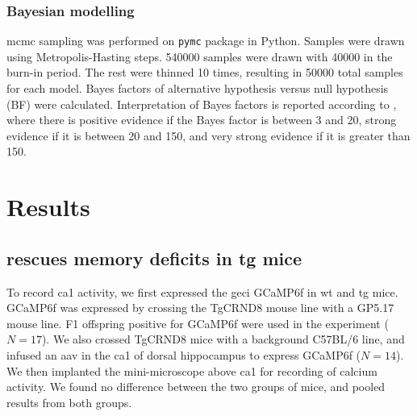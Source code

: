 \subsubsection{Bayesian modelling}
\Gls{mcmc} sampling was performed on \texttt{pymc} package in Python. Samples were drawn using Metropolis-Hasting steps. \num{540000} samples were drawn with \num{40000} in the burn-in period. The rest were thinned \num{10} times, resulting in \num{50000} total samples for each model. Bayes factors of alternative hypothesis versus null hypothesis (BF) were calculated. Interpretation of Bayes factors is reported according to \citet{kass95}, where there is positive evidence if the Bayes factor is between 3 and 20, strong evidence if it is between 20 and 150, and very strong evidence if it is greater than 150.

\section{Results}


\subsection{\tglu{} rescues memory deficits in \gls{tg} mice}

To record \gls{ca1} activity, we first expressed the \gls{geci} GCaMP6f in \gls{wt} and \gls{tg} mice. GCaMP6f was expressed by crossing the TgCRND8 mouse line with a GP5.17 mouse line. F1 offspring positive for GCaMP6f were used in the experiment ($N=17$). We also crossed TgCRND8 mice with a background C57BL/6 line, and infused an \gls{aav} in the \gls{ca1} of dorsal hippocampus to express GCaMP6f ($N=14$). We then implanted the mini-microscope above \gls{ca1} for recording of calcium activity. We found no difference between the two groups of mice, and pooled results from both groups. 

